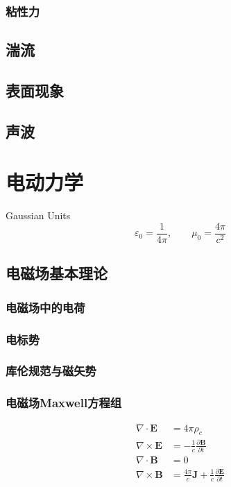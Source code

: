 \documentclass[b5paper]{book}
\begin{document}
\section{粘性力}

\chapter{湍流}

\chapter{表面现象}

\chapter{声波}

\part{电动力学}
Gaussian Units
\begin{equation}
    \varepsilon_0 = \frac{1}{4\pi}, \qquad \mu_0 = \frac{4\pi}{c^2}
\end{equation}
\chapter{电磁场基本理论}
\section{电磁场中的电荷}
\section{电标势}
\section{库伦规范与磁矢势}
\section{电磁场Maxwell方程组}
\begin{equation}
    \begin{split}
        \nabla\cdot \boldsymbol{E} &= 4\pi{\rho_c}\\
        \nabla\times\boldsymbol{E} &= -\frac{1}{c}\frac{\partial \boldsymbol{B}}{\partial t}\\
        \nabla\cdot\boldsymbol{B}&=0\\
        \nabla\times\boldsymbol{B}&=\frac{4\pi}{c}\boldsymbol{J}+\frac{1}{c}\frac{\partial\boldsymbol{E}}{\partial t}
    \end{split}
\end{equation}
\end{document}
